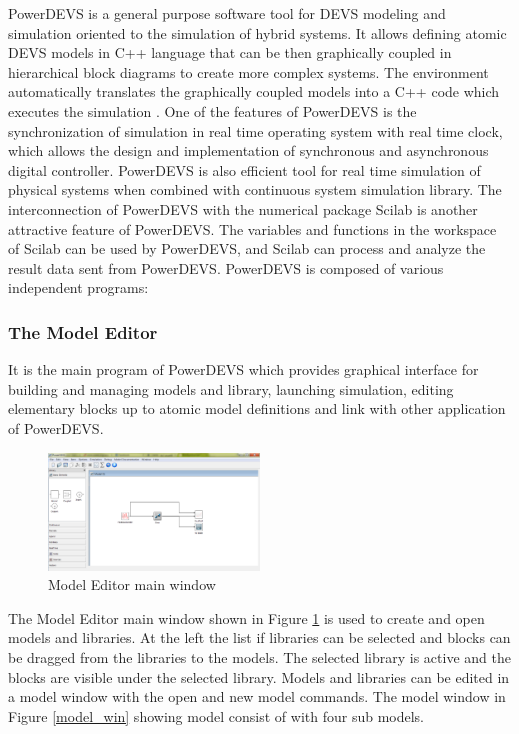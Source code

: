 \documentclass[titlepage]{article}%
\begin{document}
{PowerDEVS is a general purpose software tool for DEVS modeling and simulation oriented to the simulation of hybrid systems. It allows defining atomic DEVS models in C++ language that can be then graphically coupled in hierarchical block diagrams to create more complex systems. The environment automatically translates the graphically coupled models into a C++ code which executes the simulation \cite{BK11}.
One of the features of PowerDEVS is the synchronization of simulation in real time operating system with real time clock, which allows the design and implementation of synchronous and asynchronous digital controller. PowerDEVS is also efficient tool for real time simulation of physical systems when combined with continuous system simulation library. The interconnection of PowerDEVS with the numerical package Scilab is another attractive feature of PowerDEVS. The variables and functions in the workspace of Scilab can be used by PowerDEVS, and Scilab can process and analyze the result data sent from PowerDEVS.
PowerDEVS is composed of various independent programs: 



\subsubsection{The Model Editor} 
It is the main program of PowerDEVS which provides graphical interface for building and managing models and library, launching simulation, editing elementary blocks up to atomic model definitions and link with other application of PowerDEVS. 
 
 
 \begin{figure}[ht!]
  \centering
    \includegraphics[width=0.5\textwidth]{Fig2.png}
    \caption{Model Editor main window}
    \label{model_edt}
\end{figure}
 
The Model Editor main window shown in Figure \ref{model_edt} is used to create and open models and libraries. At the left the list if libraries can be selected and blocks can be dragged from the libraries to the models. The selected library is active and the blocks are visible under the selected library. Models and libraries can be edited in a model window with the open and new model commands. The model window in Figure \ref{model_win} showing model consist of with four sub models.


}
\end{document}

